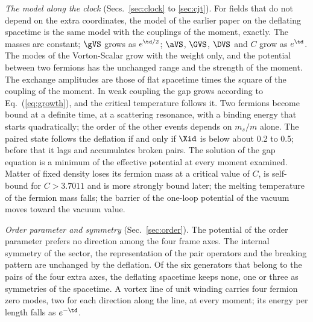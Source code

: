 \emph{The model along the clock} (Secs.~\ref{sec:clock} to \ref{sec:cjt}). For fields that do not
depend on the extra coordinates, the model of the earlier paper on the deflating spacetime is the
same model with the couplings of the moment, exactly. The masses are constant; $\gVS$ grows as
$e^{\td/2}$; $\aVS$, $\GVS$, $\DVS$ and $C$ grow as $e^{\td}$. The modes of the Vorton-Scalar grow
with the weight only, and the potential between two fermions has the unchanged range and the
strength of the moment. The exchange amplitudes are those of flat spacetime times the square of the
coupling of the moment. In weak coupling the gap grows according to Eq.~(\ref{eq:growth}), and the
critical temperature follows it. Two fermions become bound at a definite time, at a scattering
resonance, with a binding energy that starts quadratically; the order of the other events depends on
$m_s/m$ alone. The paired state follows the deflation if and only if $\Xid$ is below about 0.2 to
0.5; before that it lags and accumulates broken pairs. The solution of the gap equation is a minimum
of the effective potential at every moment examined. Matter of fixed density loses its fermion mass
at a critical value of $C$, is self-bound for $C>3.7011$ and is more strongly bound later; the
melting temperature of the fermion mass falls; the barrier of the one-loop potential of the vacuum
moves toward the vacuum value.

\emph{Order parameter and symmetry} (Sec.~\ref{sec:order}). The potential of the order parameter
prefers no direction among the four frame axes. The internal symmetry of the sector, the
representation of the pair operators and the breaking pattern are unchanged by the deflation. Of the
six generators that belong to the pairs of the four extra axes, the deflating spacetime keeps none,
one or three as symmetries of the spacetime. A vortex line of unit winding carries four fermion zero
modes, two for each direction along the line, at every moment; its energy per length falls as
$e^{-\td}$.

